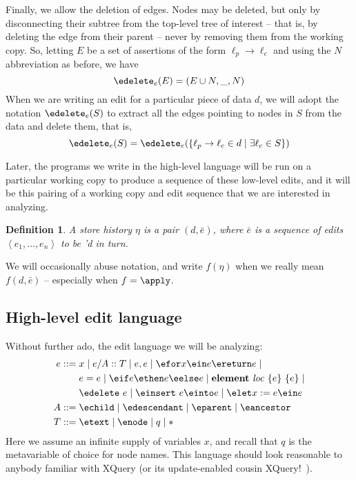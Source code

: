 \documentclass{article}
\newtheorem{definition}{Definition}
\newcommand{\loc}{\ensuremath{\mathit{loc}}\xspace}
\newcommand{\eelement}[3]{\ensuremath{\mathbf{element}\ #1\ \{#2\}\ \{#3\}}}
\begin{document}
Finally, we allow the deletion of edges. Nodes may be deleted, but only by
disconnecting their subtree from the top-level tree of interest -- that is,
by deleting the edge from their parent -- never by removing them from the
working copy. So, letting $E$ be a set of assertions of the form
$\ell_p\to\ell_c$ and using the $N$ abbreviation as before, we have
\[\edelete_e(E) = (E \cup N,\_,N)\]
When we are writing an edit for a particular piece of data $d$, we will
adopt the notation $\edelete_e(S)$ to extract all the edges pointing to
nodes in $S$ from the data and delete them, that is,
\[\edelete_e(S) = \edelete_e(\{\ell_p \to \ell_c \in d \mid \exists\ell_c
\in S\})\]

Later, the programs we write in the high-level language will be run on a
particular working copy to produce a sequence of these low-level edits, and
it will be this pairing of a working copy and edit sequence that we are
interested in analyzing.

\begin{definition}
    A \emph{store history} $\eta$ is a pair $(d,\bar e)$, where $\bar e$ is
    a sequence of edits $\left<e_1,\ldots,e_n\right>$ to be \apply'd in
    turn.
\end{definition}

We will occasionally abuse notation, and write $f(\eta)$ when we really mean
$f(d,\bar e)$ -- especially when $f=\apply$.

\subsection{High-level edit language}
Without further ado, the edit language we will be analyzing:
\begin{align*}
    e ::={}
        & x \mid e/A::T \mid e,e \mid \efor x \ein e \ereturn e \mid \\
        & e = e \mid \eif e \ethen e \eelse e \mid \eelement \loc e e \mid \\
        & \edelete\ e \mid \einsert\ e \einto e \mid \elet x := e \ein e \\
    A ::={} & \echild \mid \edescendant \mid \eparent \mid \eancestor \\
    T ::={} & \etext \mid \enode \mid q \mid *
\end{align*}
Here we assume an infinite supply of variables $x$, and recall that $q$ is
the metavariable of choice for node names. This language should look
reasonable to anybody familiar with XQuery (or its update-enabled cousin
XQuery!~\cite{ghelli2006xquery}).
\end{document}
